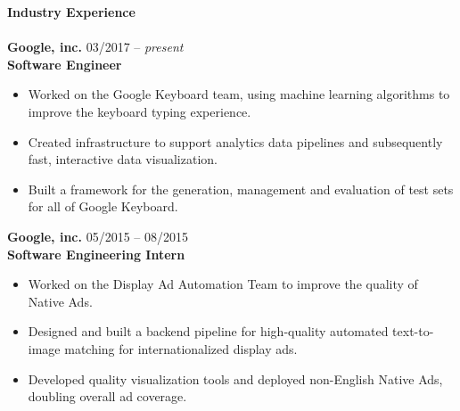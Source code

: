 \documentclass{article}
\begin{document}

\noindent
\textbf{{\Large Industry Experience}}\\[-2mm]
\HRule\\
\textbf{Google, inc.}
\hfill 03/2017 -- \textit{present}\\
\textbf{Software Engineer}
\begin{itemize}
\vspace{-2.5mm}
\item Worked on the Google Keyboard team, using machine learning algorithms to improve the keyboard typing experience.
\vspace{-2.5mm}
\item Created infrastructure to support analytics data pipelines and subsequently fast, interactive data visualization.
\vspace{-6.5mm}
\item Built a framework for the generation, management and evaluation of test sets for all of Google Keyboard.
\end{itemize}
\vspace{-2mm}

\noindent
\textbf{Google, inc.}
\hfill 05/2015 -- 08/2015\\
\textbf{Software Engineering Intern}
\begin{itemize}
\vspace{-2.5mm}
\item Worked on the Display Ad Automation Team to improve the quality of Native Ads.
\vspace{-2.5mm}
\item Designed and built a backend pipeline for high-quality automated text-to-image matching for internationalized display ads.
\vspace{-2.5mm}
\item Developed quality visualization tools and deployed non-English Native Ads, doubling overall ad coverage.
\end{itemize}
\vspace{1mm}
\end{document}
